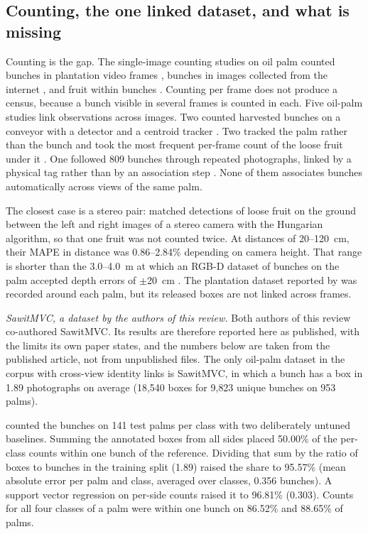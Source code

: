 \subsection{Counting, the one linked dataset, and what is missing}
Counting is the gap. The \nPalmCount single-image counting studies on oil palm counted bunches in plantation video frames \citep{naftali2024palm}, bunches in images collected from the internet \citep{prasetyo2020automatic}, and fruit within bunches \citep{hamdani2026automated}. Counting per frame does not produce a census, because a bunch visible in several frames is counted in each. Five oil-palm studies link observations across images. Two counted harvested bunches on a conveyor with a detector and a centroid tracker \citep{shiddiq2023counting,aji2021automatic}. Two tracked the palm rather than the bunch and took the most frequent per-frame count of the loose fruit under it \citep{daud2022loose,daud2023detection}. One followed 809 bunches through repeated photographs, linked by a physical tag rather than by an association step \citep{kassim2012oil}. None of them associates bunches automatically across views of the same palm.

The closest case is a stereo pair: \citet{warni2026stereo} matched detections of loose fruit on the ground between the left and right images of a stereo camera with the Hungarian algorithm, so that one fruit was not counted twice. At distances of 20--120~cm, their MAPE in distance was 0.86--2.84\% depending on camera height. That range is shorter than the 3.0--4.0~m at which an RGB-D dataset of bunches on the palm accepted depth errors of $\pm$20~cm \citep{goh2025outdoor}. The plantation dataset reported by \citet{suharjito2025oil} was recorded around each palm, but its released boxes are not linked across frames.

\textit{SawitMVC, a dataset by the authors of this review.} Both authors of this review co-authored SawitMVC. Its results are therefore reported here as published, with the limits its own paper states, and the numbers below are taken from the published article, not from unpublished files. The only oil-palm dataset in the corpus with cross-view identity links is SawitMVC, in which a bunch has a box in 1.89 photographs on average (18{,}540 boxes for 9{,}823 unique bunches on 953 palms).

\citet{indriani2026sawitmvc} counted the bunches on 141 test palms per class with two deliberately untuned baselines. Summing the annotated boxes from all sides placed 50.00\% of the per-class counts within one bunch of the reference. Dividing that sum by the ratio of boxes to bunches in the training split (1.89) raised the share to 95.57\% (mean absolute error per palm and class, averaged over classes, 0.356 bunches). A support vector regression on per-side counts raised it to 96.81\% (0.303). Counts for all four classes of a palm were within one bunch on 86.52\% and 88.65\% of palms.

